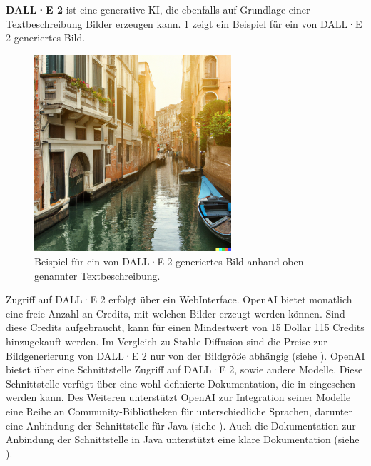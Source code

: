 \textbf{DALL·E 2} ist eine generative KI, die ebenfalls auf Grundlage einer Textbeschreibung Bilder erzeugen kann.
\cref{sec2:sota:subsubsec:fz1:discussion:fig:venice-dall·e} zeigt ein Beispiel für ein von DALL·E 2 generiertes Bild.
\begin{figure}[htb]
    \centering
    \includegraphics[width=0.65\textwidth]{chapter/chapter_2/venice-dall-e.png}
    \caption{Beispiel für ein von DALL·E 2 generiertes Bild anhand oben genannter Textbeschreibung.}
    \label{sec2:sota:subsubsec:fz1:discussion:fig:venice-dall·e}
\end{figure}
Zugriff auf DALL·E 2 erfolgt über ein WebInterface.
OpenAI bietet monatlich eine freie Anzahl an Credits, mit welchen Bilder erzeugt werden können.
Sind diese Credits aufgebraucht, kann für einen Mindestwert von 15 Dollar 115 Credits hinzugekauft werden.
Im Vergleich zu Stable Diffusion sind die Preise zur Bildgenerierung von DALL·E 2 nur von der Bildgröße abhängig (siehe \cite{openai-pricing}).
OpenAI bietet über eine Schnittstelle Zugriff auf DALL·E 2, sowie andere Modelle.
Diese Schnittstelle verfügt über eine wohl definierte Dokumentation, die in \cite{openai-api-doc} eingesehen werden kann.
Des Weiteren unterstützt OpenAI zur Integration seiner Modelle eine Reihe an Community-Bibliotheken für unterschiedliche Sprachen, darunter eine Anbindung der Schnittstelle für Java (siehe \cite{dall-e-java-api}).
Auch die Dokumentation zur Anbindung der Schnittstelle in Java unterstützt eine klare Dokumentation (siehe \cite{dall-e-java-api}).

